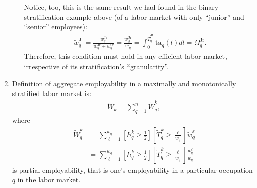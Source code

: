 \documentclass[hidelinks, nonatbib]{elsarticle}
\begin{document}
\begin{enumerate}
\begin{enumerate}
        Notice, too, this is the same result we had found in the binary stratification example above (of a labor market with only ``junior'' and ``senior'' employees):
        \begin{gather}
            \tilde{w}_{q}^{\text{Jr}} 
            =
            \frac{
                w_{q}^{\text{Jr}}
            }{
                w_{q}^{\text{Jr}} + 
                w_{q}^{\text{Sr}}
            }
            =
            \frac{
                w_{q}^{\text{Jr}}
            }{
                w_{q}
            }
            =
            \int_{0}^{\tilde{T}_{q}^{\text{Jr}}}
                \text{ta}_q(l)
                dl
            =
            \Omega_{q}^{\text{Jr}}
            .
        \end{gather}
        Therefore, this condition must hold in any efficient labor market, irrespective of its stratification's ``granularity''.
    \end{enumerate}
    \item 
    Definition of aggregate employability in a maximally and monotonically stratified labor market is: 
    \begin{gather}
        \tilde{W}_{k}
        =
        \sum_{q=1}^{n}
        \tilde{W}_{q}^{k}
        ,
    \end{gather}
    where
    \begin{align}
        \tilde{W}_{q}^{k}
        &=
        \sum_{\ell=1}^{w_q}
        \left[
            h_{q}^{k}
            \geq
            \frac{1}{2}
        \right]
        \left[
            \tilde{T}_{q}^{k}
            \geq 
            \frac{\ell}{w_q}
        \right]
        \tilde{w}_{q}^{\ell}
        \\
        &=
        \sum_{\ell=1}^{w_q}
        \left[
            h_{q}^{k}
            \geq
            \frac{1}{2}
        \right]
        \left[
            \tilde{T}_{q}^{k}
            \geq 
            \frac{\ell}{w_q}
        \right]
        \frac{
            {w}_{q}^{\ell}
        }{
            w_q
        }
    \end{align}
    is partial employability, that is one's employability in a particular occupation $q$ in the labor market.


\end{enumerate}
\end{document}
